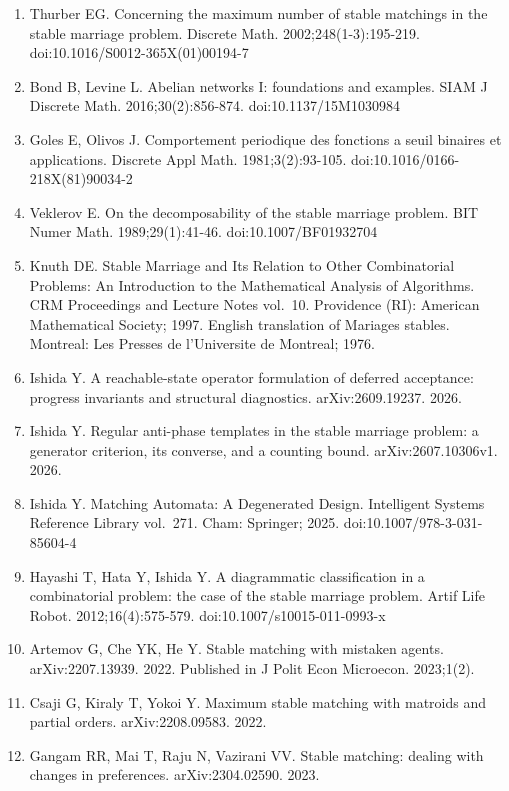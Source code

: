 \documentclass[
  11pt,
]{article}
\begin{document}
\begin{enumerate}
  the ways. Discrete Appl Math. 1995;59(3):285-292.
  doi:10.1016/0166-218X(94)00129-4
\item
  Thurber EG. Concerning the maximum number of stable matchings in the
  stable marriage problem. Discrete Math. 2002;248(1-3):195-219.
  doi:10.1016/S0012-365X(01)00194-7
\item
  Bond B, Levine L. Abelian networks I: foundations and examples. SIAM J
  Discrete Math. 2016;30(2):856-874. doi:10.1137/15M1030984
\item
  Goles E, Olivos J. Comportement periodique des fonctions a seuil
  binaires et applications. Discrete Appl Math. 1981;3(2):93-105.
  doi:10.1016/0166-218X(81)90034-2
\item
  Veklerov E. On the decomposability of the stable marriage problem. BIT
  Numer Math. 1989;29(1):41-46. doi:10.1007/BF01932704
\item
  Knuth DE. Stable Marriage and Its Relation to Other Combinatorial
  Problems: An Introduction to the Mathematical Analysis of Algorithms.
  CRM Proceedings and Lecture Notes vol.~10. Providence (RI): American
  Mathematical Society; 1997. English translation of Mariages stables.
  Montreal: Les Presses de l'Universite de Montreal; 1976.
\item
  Ishida Y. A reachable-state operator formulation of deferred
  acceptance: progress invariants and structural diagnostics.
  arXiv:2609.19237. 2026.
\item
  Ishida Y. Regular anti-phase templates in the stable marriage problem:
  a generator criterion, its converse, and a counting bound.
  arXiv:2607.10306v1. 2026.
\item
  Ishida Y. Matching Automata: A Degenerated Design. Intelligent Systems
  Reference Library vol.~271. Cham: Springer; 2025.
  doi:10.1007/978-3-031-85604-4
\item
  Hayashi T, Hata Y, Ishida Y. A diagrammatic classification in a
  combinatorial problem: the case of the stable marriage problem. Artif
  Life Robot. 2012;16(4):575-579. doi:10.1007/s10015-011-0993-x
\item
  Artemov G, Che YK, He Y. Stable matching with mistaken agents.
  arXiv:2207.13939. 2022. Published in J Polit Econ Microecon.
  2023;1(2).
\item
  Csaji G, Kiraly T, Yokoi Y. Maximum stable matching with matroids and
  partial orders. arXiv:2208.09583. 2022.
\item
  Gangam RR, Mai T, Raju N, Vazirani VV. Stable matching: dealing with
  changes in preferences. arXiv:2304.02590. 2023.

\end{enumerate}
\end{document}
